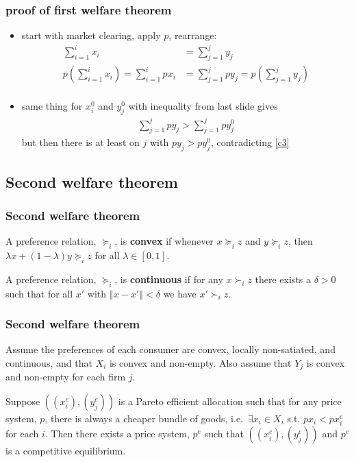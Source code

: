\documentclass[compress]{beamer}
\newcommand{\norm}[1]{\left\Vert {#1} \right\Vert}
\newcommand{\prefeq}{\succeq}
\newcommand{\pref}{\succ}
\begin{document}
\begin{frame}
  \frametitle{proof of first welfare theorem}
  \begin{itemize}
  \item start with market clearing, apply $p$, rearrange:
    \begin{align}
      \sum_{i=1}^i x_i & = \sum_{j=1}^j y_j  \\
      p(\sum_{i=1}^i x_i) =  \sum_{i=1}^i p x_i & 
      = \sum_{j=1}^j p y_j  = p(\sum_{j=1}^j y_j)  \\ 
    \end{align}
  \item same thing for $x_i^0$ and $y_j^0$ with inequality from last
    slide gives
    \begin{align}
      \sum_{j=1}^j p y_j > \sum_{j=1}^j p y_j^0 
    \end{align}
    but then there is at least on $j$ with $p y_j > p y_j^0$,
    contradicting \ref{c3}
  \end{itemize}  
\end{frame}

\subsection{Second welfare theorem}
\begin{frame}
  \frametitle{Second welfare theorem}
  \begin{definition}
    A preference relation, $\prefeq_i$, is \textbf{convex} if whenever $x
    \prefeq_i z$ and $y \prefeq_i z$, then $\lambda x + (1-\lambda) y
    \prefeq_i z$ for all $\lambda \in [0,1]$. 
  \end{definition}
  
  \begin{definition}
    A preference relation, $\prefeq_i$, is \textbf{continuous} if
    for any  $x \pref_i z$ there exists a $\delta >
    0$ such that for all $x'$ with $\norm{x - x'}<\delta$ we have $x'
    \pref_i z$.
  \end{definition}
\end{frame}

\begin{frame}
  \frametitle{Second welfare theorem}
  \begin{theorem}
    Assume the preferences of each consumer are convex, locally
    non-satiated, and continuous, and that $X_i$ is convex and
    non-empty.  
    Also assume that $Y_j$ is convex and non-empty for each
    firm $j$. 
    
    Suppose $((x_i^e), (y_j^e))$ is a Pareto efficient allocation such
    that for any price system, $p$, there is always a cheaper bundle of
    goods, i.e.\ $\exists x_i \in X_i$ s.t. $p x_i < p x_i^e$ for each
    $i$. Then there exists a price system, $p^e$ such that $((x_i^e),
    (y_j^e))$ and $p^e$ is a competitive equilibrium.
  \end{theorem}  
\end{frame}
\end{document}

